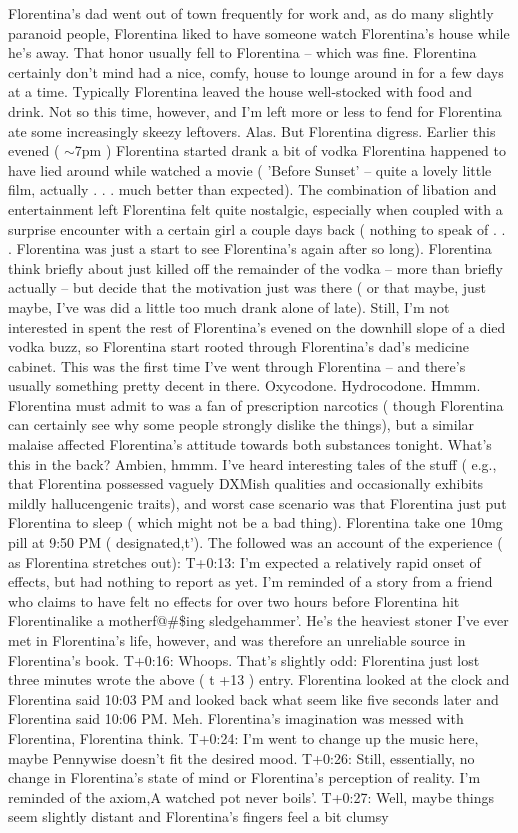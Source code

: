 \documentclass[12pt]{book}
\begin{document}
Florentina's dad went out of town frequently for work and, as do many slightly paranoid people, Florentina liked to have someone watch Florentina's house while he's away. That honor usually fell to Florentina -- which was fine. Florentina certainly don't mind had a nice, comfy, house to lounge around in for a few days at a time. Typically Florentina leaved the house well-stocked with food and drink. Not so this time, however, and I'm left more or less to fend for Florentina ate some increasingly skeezy leftovers. Alas. But Florentina digress. Earlier this evened ( $\sim$7pm ) Florentina started drank a bit of vodka Florentina happened to have lied around while watched a movie ( 'Before Sunset' -- quite a lovely little film, actually . . .  much better than expected). The combination of libation and entertainment left Florentina felt quite nostalgic, especially when coupled with a surprise encounter with a certain girl a couple days back ( nothing to speak of . . .  Florentina was just a start to see Florentina's again after so long). Florentina think briefly about just killed off the remainder of the vodka -- more than briefly actually -- but decide that the motivation just was there ( or that maybe, just maybe, I've was did a little too much drank alone of late). Still, I'm not interested in spent the rest of Florentina's evened on the downhill slope of a died vodka buzz, so Florentina start rooted through Florentina's dad's medicine cabinet. This was the first time I've went through Florentina -- and there's usually something pretty decent in there. Oxycodone. Hydrocodone. Hmmm. Florentina must admit to was a fan of prescription narcotics ( though Florentina can certainly see why some people strongly dislike the things), but a similar malaise affected Florentina's attitude towards both substances tonight. What's this in the back? Ambien, hmmm. I've heard interesting tales of the stuff ( e.g., that Florentina possessed vaguely DXMish qualities and occasionally exhibits mildly hallucengenic traits), and worst case scenario was that Florentina just put Florentina to sleep ( which might not be a bad thing). Florentina take one 10mg pill at 9:50 PM ( designated,t'). The followed was an account of the experience ( as Florentina stretches out): T+0:13: I'm expected a relatively rapid onset of effects, but had nothing to report as yet. I'm reminded of a story from a friend who claims to have felt no effects for over two hours before Florentina hit Florentinalike a motherf@\#\$ing sledgehammer'. He's the heaviest stoner I've ever met in Florentina's life, however, and was therefore an unreliable source in Florentina's book. T+0:16: Whoops. That's slightly odd: Florentina just lost three minutes wrote the above ( t +13 ) entry. Florentina looked at the clock and Florentina said 10:03 PM and looked back what seem like five seconds later and Florentina said 10:06 PM. Meh. Florentina's imagination was messed with Florentina, Florentina think. T+0:24: I'm went to change up the music here, maybe Pennywise doesn't fit the desired mood. T+0:26: Still, essentially, no change in Florentina's state of mind or Florentina's perception of reality. I'm reminded of the axiom,A watched pot never boils'. T+0:27: Well, maybe things seem slightly distant and Florentina's fingers feel a bit clumsy 
\end{document}
